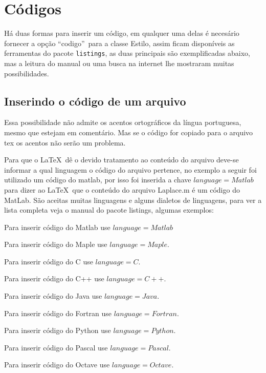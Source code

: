 \chapter{Códigos}

Há duas formas para inserir um código, em qualquer uma delas é necesário fornecer a opção ``codigo''\ para a classe Estilo, assim ficam disponíveis as ferramentas do pacote \texttt{listings}, as duas principais são exemplificadas abaixo, mas a leitura do manual ou uma busca na internet lhe mostraram
muitas possibilidades.

\section{Inserindo o código de um arquivo}

Essa possibilidade não admite os acentos ortográficos da língua portuguesa, mesmo que estejam em comentário. Mas se o código for copiado para o arquivo tex 
os acentos não serão um problema. 

Para que o \LaTeX\ dê o devido tratamento ao conteúdo do arquivo deve-se informar a qual linguagem o código do arquivo pertence, no exemplo a seguir foi utilizado um código do matlab, por isso foi inserida a chave
$language=Matlab$ para dizer ao \LaTeX\ que o conteúdo do arquivo Laplace.m é um código do MatLab. São aceitas muitas linguagens e alguns dialetos de linguagens, para ver a lista completa veja o manual do pacote
\textsf{listings}, algumas exemplos:

Para inserir código do Matlab use $language=Matlab$

Para inserir código do Maple use $language=Maple$.

Para inserir código do C use $language=C$.

Para inserir código do C++ use $language=C++$.

Para inserir código do Java use $language=Java$.

Para inserir código do Fortran use $language=Fortran$.

Para inserir código do Python use $language=Python$.

Para inserir código do Pascal use $language=Pascal$.

Para inserir código do Octave use $language=Octave$.
 
\begin{tcolorbox}[breakable]
\begin{lstlisting}

\end{lstlisting}
\tcblower

\end{tcolorbox}


